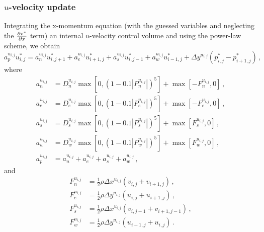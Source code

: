 \documentclass{article}
\begin{document}
\subsubsection*{$u$-velocity update}

Integrating the x-momentum equation (with the guessed variables and neglecting the $\pdv{v^*}{x}$ term) an internal $u$-velocity control volume and using the power-law scheme, we obtain
\begin{equation}
	a^{u_{i,j}}_p u^*_{i,j} = a^{u_{i,j}}_n u^*_{i, j+1} + a^{u_{i,j}}_e u^*_{i+1, j} + a^{u_{i,j}}_s u^*_{i, j-1} + a^{u_{i,j}}_w u^*_{i-1, j} + \Delta y^{u_{i,j}} (p^*_{i,j} - p^*_{i+1, j})\,,
\end{equation}
where
\begin{subequations}
	\begin{align}
		a^{u_{i,j}}_n & = D^{u_{i,j}}_n \max \left[0, (1 - 0.1 |P^{u_{i,j}}_n|)^5\right] + \max \left[ -F^{u_{i,j}}_n, 0 \right]\,, \\
		a^{u_{i,j}}_e & = D^{u_{i,j}}_e \max \left[0, (1 - 0.1 |P^{u_{i,j}}_e|)^5\right] + \max \left[ -F^{u_{i,j}}_e, 0 \right]\,, \\
		a^{u_{i,j}}_s & = D^{u_{i,j}}_s \max \left[0, (1 - 0.1 |P^{u_{i,j}}_s|)^5\right] + \max \left[ F^{u_{i,j}}_s, 0 \right]\,, \\
		a^{u_{i,j}}_w & = D^{u_{i,j}}_w \max \left[0, (1 - 0.1 |P^{u_{i,j}}_w|)^5\right] + \max \left[ F^{u_{i,j}}_w, 0 \right]\,, \\
		a^{u_{i,j}}_p & = a^{u_{i,j}}_n + a^{u_{i,j}}_e + a^{u_{i,j}}_s + a^{u_{i,j}}_w\,,
	\end{align}
\end{subequations}
and
\begin{subequations}
	\begin{align}
		F_n^{u_{i,j}} & = \frac{1}{2} \rho \Delta x^{u_{i,j}} \left(v_{i,j} + v_{i+1,j}\right)\,, \\
		F_e^{u_{i,j}} & = \frac{1}{2} \rho \Delta y^{u_{i,j}} \left(u_{i,j} + u_{i+1,j}\right)\,, \\
		F_s^{u_{i,j}} & = \frac{1}{2} \rho \Delta x^{u_{i,j}} \left(v_{i,j-1} + v_{i+1,j-1}\right)\,, \\
		F_w^{u_{i,j}} & = \frac{1}{2} \rho \Delta y^{u_{i,j}} \left(u_{i-1,j} + u_{i,j}\right)\,.
	\end{align}
\end{subequations}
\end{document}
